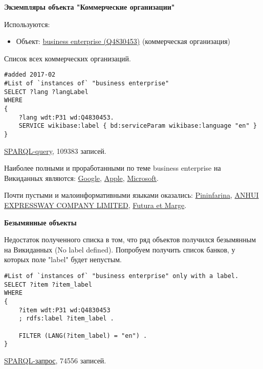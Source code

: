 \textbf{Экземпляры объекта "Коммерческие организации"}

Используются:

\begin{itemize}
    \item Объект: \href{https://www.wikidata.org/wiki/Q4830453}{business enterprise (Q4830453)} (коммерческая организация)
\end{itemize}

Список всех коммерческих организаций.

\begin{lstlisting}[language=SPARQL]
#added 2017-02
#List of `instances of` "business enterprise" 
SELECT ?lang ?langLabel
WHERE
{
    ?lang wdt:P31 wd:Q4830453.
    SERVICE wikibase:label { bd:serviceParam wikibase:language "en" }
}
\end{lstlisting}

\href{https://query.wikidata.org/#%23List%20of%20%60instances%20of%60%20%22business%20enterprise%22%20%0ASELECT%20%3Flang%20%3FlangLabel%0AWHERE%0A%7B%0A%20%20%20%20%3Flang%20wdt%3AP31%20wd%3AQ4830453.%0A%20%20%20%20SERVICE%20wikibase%3Alabel%20%7B%20bd%3AserviceParam%20wikibase%3Alanguage%20%22en%22%20%7D%0A%7D}{SPARQL-query}, 109383 записей.

Наиболее полными и проработанными по теме business enterprise на Викиданных являются:
\href{https://www.wikidata.org/wiki/Q95}{Google}, 
\href{https://www.wikidata.org/wiki/Q312}{Apple},
\href{https://www.wikidata.org/wiki/Q2283}{Microsoft}.

Почти пустыми и малоинформативными языками оказались:
\href{https://www.wikidata.org/wiki/Q40987}{Pininfarina},
\href{https://www.wikidata.org/wiki/Q46065}{ANHUI EXPRESSWAY COMPANY LIMITED},
\href{https://www.wikidata.org/wiki/Q45812}{Futura et Marge}.

\textbf{Безымянные объекты}

Недостаток полученного списка в том, что ряд объектов получился безымянным на Викиданных (No label defined). Попробуем получить список банков, у которых поле "label" будет непустым. 

\begin{lstlisting}[language=SPARQL]
#List of `instances of` "business enterprise" only with a label.
SELECT ?item ?item_label
WHERE
{
    ?item wdt:P31 wd:Q4830453
    ; rdfs:label ?item_label . 

    FILTER (LANG(?item_label) = "en") . 
}
\end{lstlisting}

\href{https://query.wikidata.org/#SELECT%20%3Fitem%20%3Fitem_label%0AWHERE%0A%7B%0A%20%20%20%20%3Fitem%20wdt%3AP31%20wd%3AQ4830453%0A%20%20%20%20%3B%20rdfs%3Alabel%20%3Fitem_label%20.%20%0A%0A%20%20%20%20FILTER%20%28LANG%28%3Fitem_label%29%20%3D%20%22en%22%29%20.%20%0A%7D}{SPARQL-запрос}, 74556 записей.